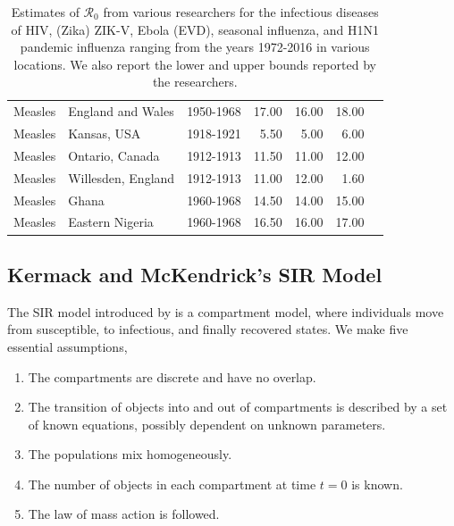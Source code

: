\documentclass[12pt]{article}
\newcommand{\rr}{\ensuremath{\mathcal{R}_0}}
\begin{document}
\begin{landscape}
\begin{table}
\begin{tabular}{@{}lllrrrl@{}}
  Measles     & England and Wales                  & 1950-1968                          & 17.00      & 16.00          & 18.00         & \cite{anderson1992}     \\
  Measles     & Kansas, USA                  & 1918-1921                          & 5.50    & 5.00          & 6.00          & \cite{anderson1992}     \\
  Measles     & Ontario, Canada                  & 1912-1913                         & 11.50        & 11.00           & 12.00            & \cite{anderson1992}     \\
  Measles     & Willesden, England                  & 1912-1913                          & 11.00        & 12.00       & 1.60            & \cite{anderson1992}     \\
  Measles     & Ghana                 & 1960-1968                          & 14.50       & 14.00          & 15.00            & \cite{anderson1992}     \\
  Measles     & Eastern Nigeria                  & 1960-1968                          & 16.50        & 16.00          & 17.00           & \cite{anderson1992}     \\
\bottomrule
\end{tabular}
\caption{Estimates of $\rr$ from various researchers for the infectious diseases of HIV, (Zika) ZIK-V, Ebola (EVD), seasonal influenza, and H1N1 pandemic influenza ranging from the years 1972-2016 in various locations.  We also report the lower and upper bounds reported by the researchers.}
\label{tab:r0-real-ex}
\end{table}
\end{landscape}



\subsection{Kermack and McKendrick's SIR Model}
\label{sec:sir-intro}

The SIR model introduced by \cite{Kermack700} is a compartment model, where individuals move from susceptible, to infectious, and finally recovered states.  We make five essential assumptions,
\begin{enumerate}
\item The compartments are discrete and have no overlap.
\item The transition of objects into and out of compartments is described by a set of known equations, possibly dependent on unknown parameters.
\item The populations mix homogeneously.
\item The number of objects in each compartment at time $t=0$ is known.
  \item The law of mass action is followed.
  \end{enumerate}  
\end{document}
